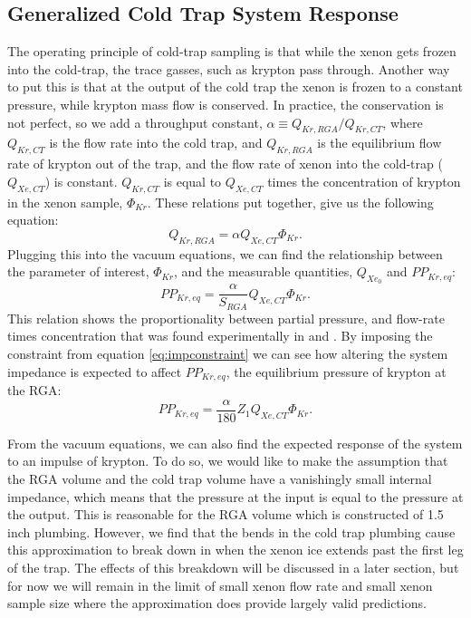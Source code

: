 \subsection{Generalized Cold Trap System Response}
\label{sec:response}
The operating principle of cold-trap sampling is that while the xenon gets frozen into the cold-trap, the trace gasses, such as krypton pass through. Another way to put this is that at the output of the cold trap the xenon is frozen to a constant pressure, while krypton mass flow is conserved. In practice, the conservation is not perfect, so we add a throughput constant, $\alpha \equiv Q_{Kr,RGA}/Q_{Kr,CT}$, where $Q_{Kr,CT}$ is the flow rate into the cold trap, and $Q_{Kr,RGA}$ is the equilibrium flow rate of krypton out of the trap, and the flow rate of xenon into the cold-trap ($Q_{Xe,CT}$) is constant. $Q_{Kr,CT}$ is equal to $Q_{Xe,CT}$ times the concentration of krypton in the xenon sample, $\Phi_{Kr}$. These relations put together, give us the following equation: 
\begin{equation}
Q_{Kr,RGA}=\alpha Q_{Xe,CT}\Phi_{Kr}.
\end{equation}
Plugging this into the vacuum equations, we can find the relationship between the parameter of interest, $\Phi_{Kr}$, and the measurable quantities, $Q_{Xe_0}$ and $PP_{Kr,eq}$:
\begin{equation}
\label{eq:krpres1}
PP_{Kr,eq}=\frac{\alpha}{S_{RGA}}Q_{Xe,CT}\Phi_{Kr}.
\end{equation}
This relation shows the proportionality between partial pressure, and flow-rate times concentration that was found experimentally in \cite{sampling_doug} and \cite{sampling_dm}. By imposing the constraint from equation \ref{eq:impconstraint} we can see how altering the system impedance is expected to affect $PP_{Kr,eq}$, the equilibrium pressure of krypton at the RGA:
\begin{equation}
\label{eq:krpres2}
PP_{Kr,eq}=\frac{\alpha}{180}Z_{1}Q_{Xe,CT}\Phi_{Kr}.
\end{equation}

From the vacuum equations, we can also find the expected response of the system to an impulse of krypton. To do so, we would like to make the assumption that the RGA volume and the cold trap volume have a vanishingly small internal impedance, which means that the pressure at the input is equal to the pressure at the output. This is reasonable for the RGA volume which is constructed of 1.5 inch plumbing. However, we find that the bends in the cold trap plumbing cause this approximation to break down in when the xenon ice extends past the first leg of the trap. The effects of this breakdown will be discussed in a later section, but for now we will remain in the limit of small xenon flow rate and small xenon sample size where the approximation does provide largely valid predictions.

